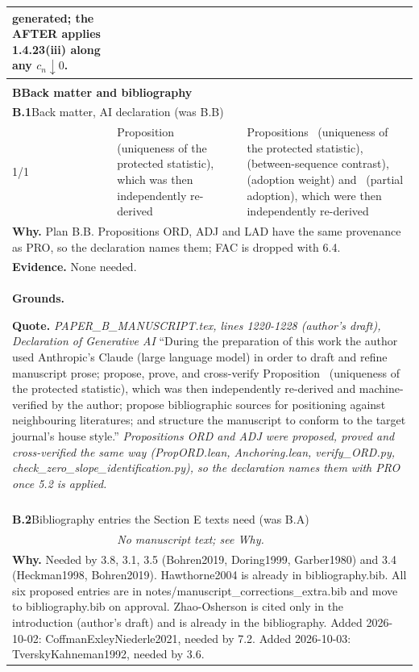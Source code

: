\documentclass[10pt]{article}
\theoremstyle{definition}
\renewcommand{\ref}[1]{\textsc{\detokenize{#1}}}
\newlength{\fullw}\setlength{\fullw}{25.9cm}
\newcommand{\entryhead}[2]{\multicolumn{3}{|l|}{\rule{0pt}{2.6ex}\large\textbf{#1}\quad #2} \\ \hline}
\begin{document}
{\begin{longtable}{|p{0.9cm}|p{12.2cm}|p{12.2cm}|}
{{generated; the AFTER applies 1.4.23(iii) along any $c_n \downarrow 0$.}} \\ \hline
\multicolumn{3}{|l|}{} \\ \hline
\multicolumn{3}{|l|}{\rule{0pt}{3.2ex}\Large\textbf{B\quad Back matter and bibliography}} \\ \hline\hline
\entryhead{B.1}{Back matter, AI declaration (was B.B)\quad{\footnotesize\textit{(formerly E.13)}}}
1/1 & Proposition~\ref{prop:PRO} (uniqueness of the protected statistic), which was then independently re-derived & Propositions~\ref{prop:PRO} (uniqueness of the protected statistic), \ref{prop:ORD} (between-sequence contrast), \ref{prop:ADJ} (adoption weight) and~\ref{prop:LAD} (partial adoption), which were then independently re-derived \\ \hline
\multicolumn{3}{|p{\fullw}|}{\textbf{Why.} Plan B.B. Propositions ORD, ADJ and LAD have the same provenance as PRO, so the declaration names them; FAC is dropped with 6.4.} \\
\multicolumn{3}{|p{\fullw}|}{\textbf{Evidence.} None needed.} \\ \hline
\multicolumn{3}{|p{\fullw}|}{\textbf{Grounds.}\par \textbf{Quote.} \textit{PAPER\_B\_MANUSCRIPT.tex, lines 1220-1228 (author's draft), Declaration of Generative AI} \newline ``During the preparation of this work the author used Anthropic's Claude (large
language model) in order to draft and refine manuscript prose; propose, prove, and
cross-verify Proposition~\ref{prop:PRO} (uniqueness of the protected statistic), which
was then independently re-derived and machine-verified by the author; propose
bibliographic sources for positioning against neighbouring literatures; and structure
the manuscript to conform to the target journal's house style.'' \newline \textit{Propositions ORD and ADJ were proposed, proved and cross-verified the same way (PropORD.lean, Anchoring.lean, verify\_ORD.py, check\_zero\_slope\_identification.py), so the declaration names them with PRO once 5.2 is applied.}} \\ \hline
\multicolumn{3}{|l|}{} \\ \hline
\entryhead{B.2}{Bibliography entries the Section E texts need (was B.A)\quad{\footnotesize\textit{(formerly E.14)}}}
 & \multicolumn{2}{p{24.6cm}|}{\textit{No manuscript text; see Why.}} \\ \hline
\multicolumn{3}{|p{\fullw}|}{\textbf{Why.} Needed by 3.8, 3.1, 3.5 (Bohren2019, Doring1999, Garber1980) and 3.4 (Heckman1998, Bohren2019). Hawthorne2004 is already in bibliography.bib. All six proposed entries are in notes/manuscript\_corrections\_extra.bib and move to bibliography.bib on approval. Zhao-Osherson is cited only in the introduction (author's draft) and is already in the bibliography. Added 2026-10-02: CoffmanExleyNiederle2021, needed by 7.2. Added 2026-10-03: TverskyKahneman1992, needed by 3.6.} \\

\end{longtable}}
\end{document}
